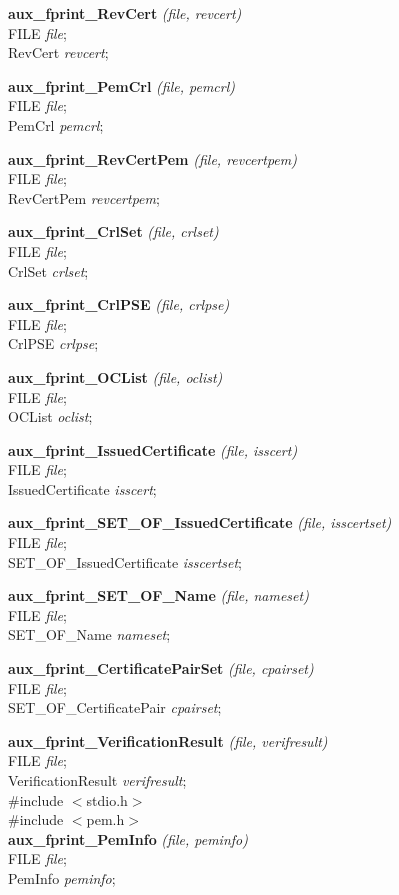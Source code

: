 {\bf aux\_fprint\_RevCert} {\em (file, revcert)} \\
FILE {\em *file}; \\
RevCert {\em *revcert};

{\bf aux\_fprint\_PemCrl} {\em (file, pemcrl)} \\
FILE {\em *file}; \\
PemCrl {\em *pemcrl};

{\bf aux\_fprint\_RevCertPem} {\em (file, revcertpem)} \\
FILE {\em *file}; \\
RevCertPem {\em *revcertpem};

{\bf aux\_fprint\_CrlSet} {\em (file, crlset)} \\
FILE {\em *file}; \\
CrlSet {\em *crlset};

{\bf aux\_fprint\_CrlPSE} {\em (file, crlpse)} \\
FILE {\em *file}; \\
CrlPSE {\em *crlpse};

{\bf aux\_fprint\_OCList} {\em (file, oclist)} \\
FILE {\em *file}; \\
OCList {\em *oclist};

{\bf aux\_fprint\_IssuedCertificate} {\em (file, isscert)} \\
FILE {\em *file}; \\
IssuedCertificate {\em *isscert};

{\bf aux\_fprint\_SET\_OF\_IssuedCertificate} {\em (file, isscertset)} \\
FILE {\em *file}; \\
SET\_OF\_IssuedCertificate {\em *isscertset};

{\bf aux\_fprint\_SET\_OF\_Name} {\em (file, nameset)} \\
FILE {\em *file}; \\
SET\_OF\_Name {\em *nameset};

{\bf aux\_fprint\_CertificatePairSet} {\em (file, cpairset)} \\
FILE {\em *file}; \\
SET\_OF\_CertificatePair {\em *cpairset};

{\bf aux\_fprint\_VerificationResult} {\em (file, verifresult)} \\
FILE {\em *file}; \\
VerificationResult {\em *verifresult};
\\ [1em]
\#include $<$stdio.h$>$ \\
\#include $<$pem.h$>$ \\ [1em]
{\bf aux\_fprint\_PemInfo} {\em (file, peminfo)} \\
FILE {\em *file}; \\
PemInfo {\em *peminfo};

